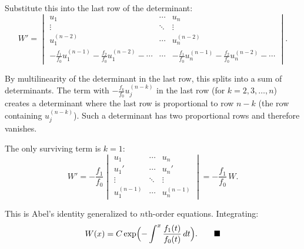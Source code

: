 \documentclass[12pt]{article}
\begin{document}
Substitute this into the last row of the determinant:
\[
W' = \begin{vmatrix} u_1 & \cdots & u_n \\ \vdots & \ddots & \vdots \\ u_1^{(n-2)} & \cdots & u_n^{(n-2)} \\ -\frac{f_1}{f_0}u_1^{(n-1)} - \frac{f_2}{f_0}u_1^{(n-2)} - \cdots & \cdots & -\frac{f_1}{f_0}u_n^{(n-1)} - \frac{f_2}{f_0}u_n^{(n-2)} - \cdots \end{vmatrix}.
\]

By multilinearity of the determinant in the last row, this splits into a sum of determinants. The term with $-\frac{f_k}{f_0}u_j^{(n-k)}$ in the last row (for $k = 2, 3, \ldots, n$) creates a determinant where the last row is proportional to row $n-k$ (the row containing $u_j^{(n-k)}$). Such a determinant has two proportional rows and therefore vanishes.

The only surviving term is $k = 1$:
\[
W' = -\frac{f_1}{f_0}\begin{vmatrix} u_1 & \cdots & u_n \\ u_1' & \cdots & u_n' \\ \vdots & \ddots & \vdots \\ u_1^{(n-1)} & \cdots & u_n^{(n-1)} \end{vmatrix} = -\frac{f_1}{f_0}\,W.
\]

This is Abel's identity generalized to $n$th-order equations. Integrating:
\[
W(x) = C\exp\Bigl(-\int^x \frac{f_1(t)}{f_0(t)}\,dt\Bigr). \qquad \blacksquare
\]
\end{document}
